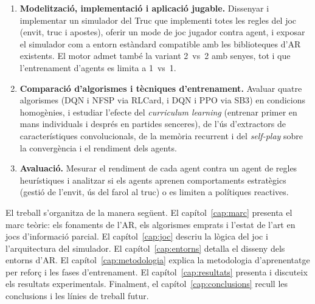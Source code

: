 \begin{enumerate}
  \item \textbf{Modelització, implementació i aplicació jugable.} Dissenyar i
    implementar un simulador del Truc que implementi totes les regles del joc
    (envit, truc i apostes), oferir un mode de joc jugador contra agent, i
    exposar el simulador com a entorn estàndard compatible amb les biblioteques
    d'\ac{AR} existents. El motor admet també la variant 2~vs~2 amb senyes,
    tot i que l'entrenament d'agents es limita a 1~vs~1.

  \item \textbf{Comparació d'algorismes i tècniques d'entrenament.} Avaluar quatre
    algorismes (\acf{DQN} i \acf{NFSP} via RLCard, i \ac{DQN} i \acf{PPO} via \acf{SB3})
    en condicions homogènies, i estudiar l'efecte del \emph{curriculum learning}
    (entrenar primer en mans individuals i després en partides senceres), de l'ús
    d'extractors de característiques convolucionals, de la memòria recurrent i
    del \emph{self-play} sobre la convergència i el rendiment dels agents.

  \item \textbf{Avaluació.} Mesurar el rendiment de cada agent contra un agent de
    regles heurístiques i analitzar si els agents aprenen comportaments estratègics
    (gestió de l'envit, ús del farol al truc) o es limiten a polítiques reactives.
\end{enumerate}

El treball s'organitza de la manera següent. El capítol~\ref{cap:marc} presenta el
marc teòric: els fonaments de l'\ac{AR}, els algorismes emprats i l'estat de l'art
en jocs d'informació parcial. El capítol~\ref{cap:joc} descriu la lògica del joc i
l'arquitectura del simulador. El capítol~\ref{cap:entorns} detalla el disseny dels
entorns d'\ac{AR}. El capítol~\ref{cap:metodologia} explica la metodologia
d'aprenentatge per reforç i les fases d'entrenament. El capítol~\ref{cap:resultats}
presenta i discuteix els resultats experimentals. Finalment, el capítol~\ref{cap:conclusions}
recull les conclusions i les línies de treball futur.
